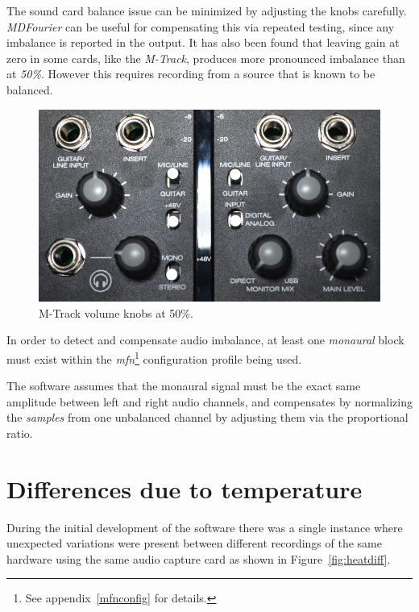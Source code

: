 \documentclass[10pt,a4paper]{report}
\begin{document}
\begin{appendices}
The sound card balance issue can be minimized by adjusting the knobs carefully. \textit{MDFourier} can be useful for compensating this via repeated testing, since any imbalance is reported in the output. It has also been found that leaving gain at zero in some cards, like the \textit{M-Track}, produces more pronounced imbalance than at \textit{50\%}. However this requires recording from a source that is known to be balanced.

\begin{figure}[H]
	\centering
	\includegraphics[width=0.8\linewidth]{images/imbalance/mtrack.png}
	\caption[M-Track knobs]{M-Track volume knobs at 50\%.}
	\label{fig:mtrackknobs}
\end{figure}

In order to detect and compensate audio imbalance, at least one \textit{monaural} block must exist within the \textit{mfn}\footnote{See appendix~\ref{mfnconfig} for details.} configuration profile being used.

The software assumes that the monaural signal must be the exact same amplitude between left and right audio channels, and compensates by normalizing the \textit{samples} from one unbalanced channel by adjusting them via the proportional ratio. 

\chapter{Differences due to temperature}

During the initial development of the software there was a single instance where unexpected variations were present between different recordings of the same hardware using the same audio capture card as shown in Figure~\ref{fig:heatdiff}.


\end{appendices}
\end{document}
